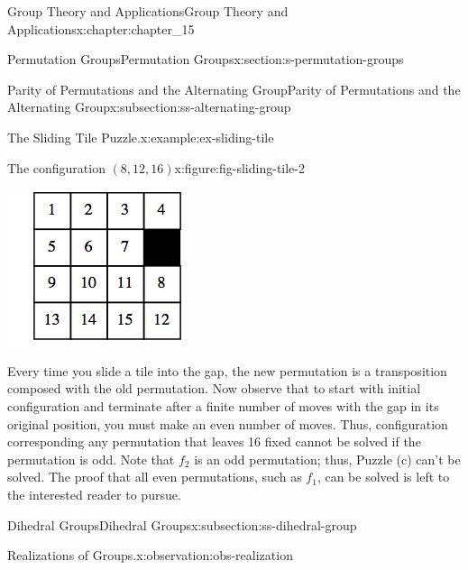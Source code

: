 \documentclass[twoside,10pt,]{book}
\numberwithin{equation}{section}
\begin{document}
\begin{chapterptx}{Group Theory and Applications}{}{Group Theory and Applications}{}{}{x:chapter:chapter_15}
\begin{sectionptx}{Permutation Groups}{}{Permutation Groups}{}{}{x:section:s-permutation-groups}
\begin{subsectionptx}{Parity of Permutations and the Alternating Group}{}{Parity of Permutations and the Alternating Group}{}{}{x:subsection:ss-alternating-group}
\begin{example}{The Sliding Tile Puzzle.}{x:example:ex-sliding-tile}
\begin{figureptx}{The configuration \((8, 12, 16)\)}{x:figure:fig-sliding-tile-2}{}
\begin{image}{0.3}{0.4}{0.3}
\includegraphics[width=\linewidth]{images/fig-sliding-tile-2.png}
\end{image}%
\tcblower
\end{figureptx}%
Every time you slide a tile into the gap, the new permutation is a transposition composed with the old permutation. Now observe that to start with initial configuration and terminate after a finite number of moves with the gap in its original position, you must make an even number of moves. Thus, configuration corresponding any permutation that leaves 16 fixed  cannot be solved if the permutation is odd.  Note that \(f_2\) is an odd permutation; thus, Puzzle (c) can't be solved. The proof that all even permutations, such as  \(f_1\), can be solved is left to the interested reader to pursue.%
\end{example}
\end{subsectionptx}
%
%
\typeout{************************************************}
\typeout{************************************************}
%
\begin{subsectionptx}{Dihedral Groups}{}{Dihedral Groups}{}{}{x:subsection:ss-dihedral-group}
%
\begin{observation}{Realizations of Groups.}{x:observation:obs-realization}%

\end{observation}
\end{subsectionptx}
\end{sectionptx}
\end{chapterptx}
\end{document}
